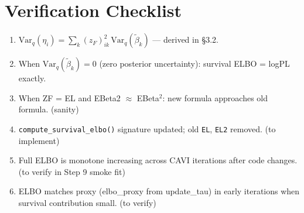\documentclass[11pt]{article}
\newcommand{\Var}{\mathrm{Var}}
\begin{document}
\section{Verification Checklist}

\begin{verifybox}[D4 Verification]
\begin{enumerate}
  \item $\Var_q(\eta_i) = \sum_k (z_F)_{ik}^2\,\Var_q(\tilde\beta_k)$ — derived in \S3.2. \checkmark
  \item When $\Var_q(\tilde\beta_k) = 0$ (zero posterior uncertainty): survival ELBO = logPL exactly. \checkmark
  \item When ZF = EL and EBeta2 $\approx$ EBeta$^2$: new formula approaches old formula. \checkmark (sanity)
  \item \texttt{compute\_survival\_elbo()} signature updated; old \texttt{EL}, \texttt{EL2} removed. (to implement)
  \item Full ELBO is monotone increasing across CAVI iterations after code changes. (to verify in Step 9 smoke fit)
  \item ELBO matches proxy (elbo\_proxy from update\_tau) in early iterations when survival contribution small. (to verify)
\end{enumerate}
\end{verifybox}
\end{document}
